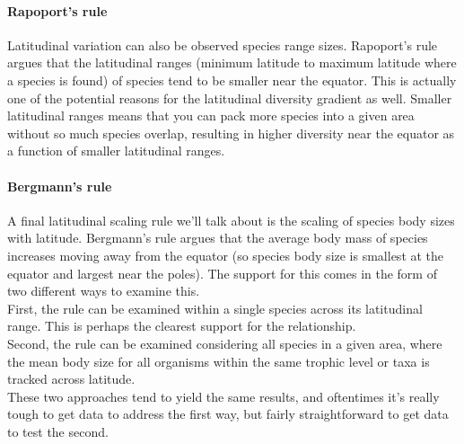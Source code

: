 \documentclass[12pt]{article}
\begin{document}
\paragraph*{Rapoport's rule}

Latitudinal variation can also be observed species range sizes. Rapoport's rule argues that the latitudinal ranges (minimum latitude to maximum latitude where a species is found) of species tend to be smaller near the equator. This is actually one of the potential reasons for the latitudinal diversity gradient as well. Smaller latitudinal ranges means that you can pack more species into a given area without so much species overlap, resulting in higher diversity near the equator as a function of smaller latitudinal ranges.

















\bigskip




\paragraph*{Bergmann's rule}

A final latitudinal scaling rule we'll talk about is the scaling of species body sizes with latitude. Bergmann's rule argues that the average body mass of species increases moving away from the equator (so species body size is smallest at the equator and largest near the poles). The support for this comes in the form of two different ways to examine this. \\

First, the rule can be examined within a single species across its latitudinal range. This is perhaps the clearest support for the relationship. \\

Second, the rule can be examined considering all species in a given area, where the mean body size for all organisms within the same trophic level or taxa is tracked across latitude.\\

These two approaches tend to yield the same results, and oftentimes it's really tough to get data to address the first way, but fairly straightforward to get data to test the second. 
\end{document}

